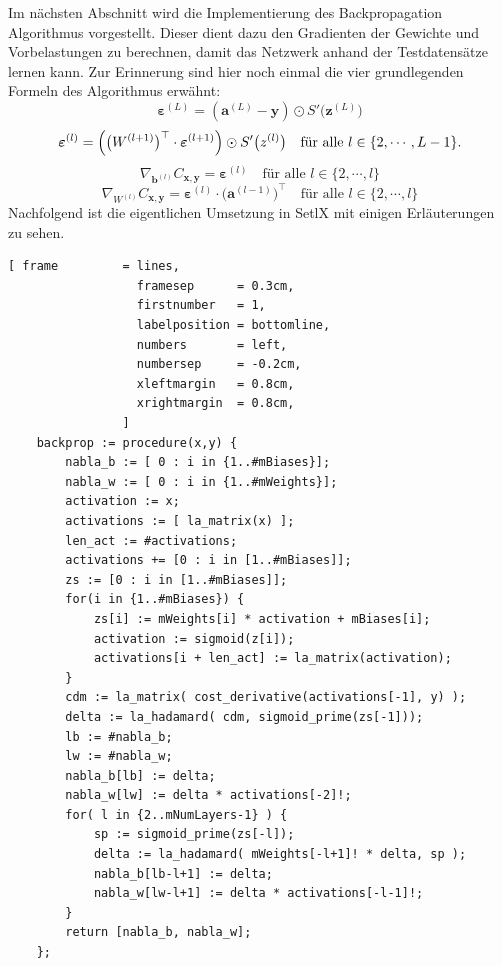 \noindent
Im nächsten Abschnitt wird die Implementierung des Backpropagation Algorithmus vorgestellt. Dieser dient dazu den Gradienten der Gewichte und Vorbelastungen zu berechnen, damit das Netzwerk anhand der Testdatensätze lernen kann. Zur Erinnerung sind hier noch einmal die vier grundlegenden Formeln des Algorithmus erwähnt:
\begin{equation} \label{eq:BP1_impl}
	\boldsymbol{\varepsilon}^{(L)} = (\mathbf{a}^{(L)} - \mathbf{y}) \odot S'\bigl(\mathbf{z}^{(L)}\bigr)  
\end{equation}
\begin{equation} \label{eq:BP2_impl}
	\boldsymbol{\varepsilon}^{(l)} = \Bigl(\bigl(W^{(l+1)}\bigr)^\top \cdot \boldsymbol{\varepsilon}^{(l+1)}\Bigr) \odot
  S'\bigl(z^{(l)}\bigr) \quad \mbox{für alle $l \in \{2, \cdots, L-1\}$}.
\end{equation}
\begin{equation} \label{eq:BP3_impl}
	\nabla_{\mathbf{b}^{(l)}} C_{\mathbf{x}, \mathbf{y}} = \boldsymbol{\varepsilon}^{(l)}
  \quad \mbox{für alle $l \in \{2, \cdots,l\}$}
\end{equation}
\begin{equation} \label{eq:BP4_impl}
	\nabla_{W^{(l)}} C_{\mathbf{x}, \mathbf{y}} = \boldsymbol{\varepsilon}^{(l)} \cdot \bigl(\mathbf{a}^{(l-1)}\bigr)^\top
  \quad \mbox{für alle $l \in \{2, \cdots,l\}$}
\end{equation}
Nachfolgend ist die eigentlichen Umsetzung in SetlX mit einigen Erläuterungen zu sehen.
\begin{Verbatim}[ frame         = lines, 
                  framesep      = 0.3cm, 
                  firstnumber   = 1,
                  labelposition = bottomline,
                  numbers       = left,
                  numbersep     = -0.2cm,
                  xleftmargin   = 0.8cm,
                  xrightmargin  = 0.8cm,
                ]
    backprop := procedure(x,y) {
        nabla_b := [ 0 : i in {1..#mBiases}];
        nabla_w := [ 0 : i in {1..#mWeights}];
        activation := x;
        activations := [ la_matrix(x) ];
        len_act := #activations;
        activations += [0 : i in [1..#mBiases]];
        zs := [0 : i in [1..#mBiases]];		
        for(i in {1..#mBiases}) {
            zs[i] := mWeights[i] * activation + mBiases[i];	
            activation := sigmoid(z[i]);
            activations[i + len_act] := la_matrix(activation);
        }
        cdm := la_matrix( cost_derivative(activations[-1], y) );
        delta := la_hadamard( cdm, sigmoid_prime(zs[-1]));
        lb := #nabla_b;
        lw := #nabla_w;
        nabla_b[lb] := delta;	
        nabla_w[lw] := delta * activations[-2]!;				
        for( l in {2..mNumLayers-1} ) {
            sp := sigmoid_prime(zs[-l]);	
            delta := la_hadamard( mWeights[-l+1]! * delta, sp );
            nabla_b[lb-l+1] := delta;
            nabla_w[lw-l+1] := delta * activations[-l-1]!;
        }
        return [nabla_b, nabla_w];
    };
\end{Verbatim}
